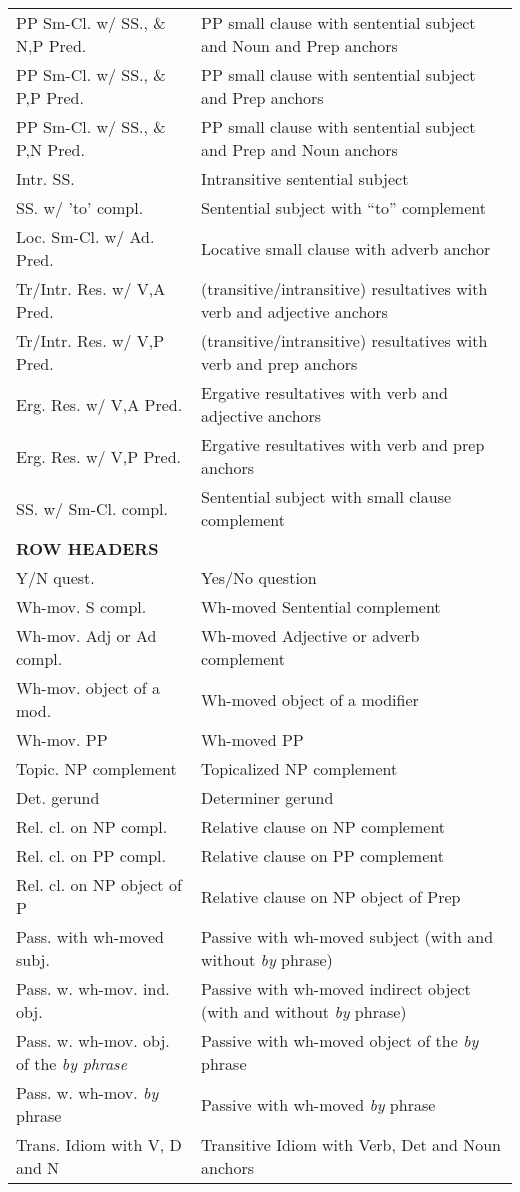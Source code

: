 \begin{tabular}{ll}
PP Sm-Cl. w/ SS., \& N,P Pred. & PP small clause with sentential subject
and Noun and Prep anchors \\
PP Sm-Cl. w/ SS., \& P,P Pred. & PP small clause with sentential subject
and Prep anchors \\
PP Sm-Cl. w/ SS., \& P,N Pred. & PP small clause with sentential subject
and Prep and Noun anchors \\
Intr. SS. & Intransitive sentential subject \\
SS. w/ 'to' compl. & Sentential subject with ``to'' complement \\
Loc. Sm-Cl. w/ Ad. Pred. & Locative small clause with adverb anchor \\
Tr/Intr. Res. w/ V,A Pred. & (transitive/intransitive) resultatives with verb and adjective anchors
\\
Tr/Intr. Res. w/ V,P Pred. & (transitive/intransitive) resultatives with verb and prep anchors
\\
Erg. Res. w/ V,A Pred. & Ergative resultatives with verb and adjective
anchors \\
Erg. Res. w/ V,P Pred. & Ergative resultatives with verb and prep
anchors \\
SS. w/ Sm-Cl. compl. & Sentential subject with small clause complement \\
\hline
{\bf ROW HEADERS} & \\
\hline
Y/N quest.&Yes/No question \\
Wh-mov. S compl.&Wh-moved Sentential complement \\
Wh-mov. Adj or Ad compl.&Wh-moved Adjective or adverb complement \\
Wh-mov. object of a mod.&Wh-moved object of a modifier \\
Wh-mov. PP&Wh-moved PP \\
Topic. NP complement&Topicalized NP complement \\
Det. gerund&Determiner gerund \\
Rel. cl. on NP compl.&Relative clause on NP complement \\
Rel. cl. on PP compl.& Relative clause on PP complement\\
Rel. cl. on NP object of P& Relative clause on NP object of Prep\\
Pass. with wh-moved subj.&Passive with wh-moved subject (with and without {\it by} phrase) \\
Pass. w. wh-mov. ind. obj.&Passive with wh-moved indirect object (with and without {\it by} phrase) \\
Pass. w. wh-mov. obj. of the {\it {\it by} phrase}&Passive with wh-moved object of the {\it by} phrase \\
Pass. w. wh-mov. {\it by} phrase&Passive with wh-moved {\it by} phrase \\
Trans. Idiom with V, D and N & Transitive Idiom with Verb, Det and
Noun anchors\\

\end{tabular}
\normalsize

